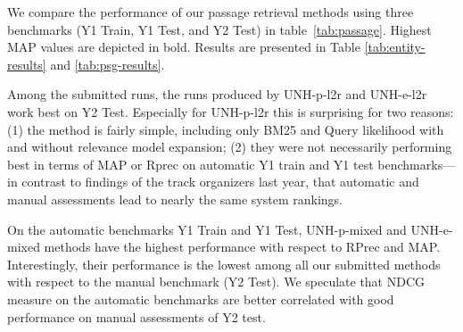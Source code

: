 \documentclass{article}
\begin{document}
We compare the performance of our passage retrieval methods using three benchmarks (Y1 Train, Y1 Test, and Y2 Test) in table~\ref{tab:passage}.
Highest MAP values are depicted in bold. Results are presented in Table \ref{tab:entity-results} and \ref{tab:psg-results}.

Among the submitted runs, the runs produced by UNH-p-l2r and UNH-e-l2r work best on Y2 Test. Especially for UNH-p-l2r this is surprising for two reasons: (1) the method is fairly simple, including only BM25 and Query likelihood with and without relevance model expansion; (2) they were not necessarily performing best in terms of MAP or Rprec on automatic Y1 train and Y1 test benchmarks---in contrast to findings of the track organizers last year, that automatic and manual assessments lead to nearly the same system rankings.

On the automatic benchmarks Y1 Train and Y1 Test, UNH-p-mixed and UNH-e-mixed methods have the highest performance with respect to RPrec and MAP. Interestingly, their performance is the lowest among all our submitted methods with respect to the manual benchmark (Y2 Test). We speculate that NDCG measure on the automatic benchmarks are better correlated with good performance on manual assessments of Y2 test.

\begin{table}
\centering
\caption{Performance of entity retrieval methods. Y1 Train and Y2 Test benchmarks are derived from an automatically generated ground truth. The Y2 Test benchmark contains the TREC 2018 manual assessments.\label{tab:entity-results}}
\label{tab:entity}
\end{table}
\end{document}
